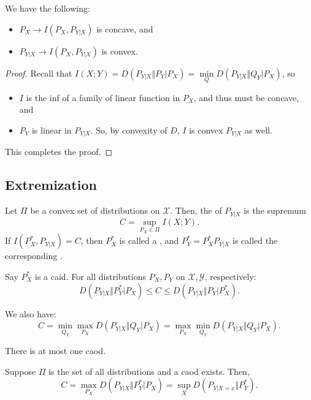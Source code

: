 \begin{thm}
	We have the following:
	\begin{itemize}
		\item $P_X \to I(P_X,P_{Y|X})$ is concave, and
		\item $P_{Y|X} \to I(P_X,P_{Y|X})$ is convex.
	\end{itemize}
\end{thm}

\begin{proof}
	Recall that $I(X;Y) = D(P_{Y|X} \Vert P_Y|P_X) = \min\limits_Q D(P_{Y|X} \Vert Q_Y|P_X)$, so 
	\begin{itemize}
		\item $I$ is the inf of a family of linear function in $P_X$, and thus must be concave, and
		\item $P_Y$ is linear in $P_{Y|X}$. So, by convexity of $D$, $I$ is convex $P_{Y|X}$ as well.  
	\end{itemize}
	This completes the proof.
\end{proof}

\subsection{Extremization}

\begin{defn}
	Let $\Pi$ be a convex set of distributions on $\mathcal X$. 
	Then, the  of $P_{Y|X}$ is the supremum \[
		C = \sup_{P_X\in \Pi} I(X;Y).
	\]
	If $I(P_X^*, P_{Y|X}) = C$, then $P_X^*$ is called a , and $P_Y^* = P_X^* P_{Y|X}$ is called the corresponding .
\end{defn}

\begin{thm}
	Say $P_X^*$ is a caid. For all distributions $P_X, P_Y$ on $\mathcal X, \mathcal Y$, respectively: \[
		D(P_{Y|X} \Vert P_Y^*|P_X) \leq C \leq D(P_{Y|X}\Vert P_Y|P_X^*).
	\]
\end{thm}

\begin{cor}
	We also have: \[
		C = \min_{Q_Y} \max_{P_X} D(P_{Y|X} \Vert Q_Y|P_X) = \max_{P_X} \min_{Q_Y} D(P_{Y|X} \Vert Q_Y|P_X).
	\]
\end{cor}

\begin{cor}
	There is at most one caod.
\end{cor}

\begin{cor}
	Suppose $\Pi$ is the set of all distributions and a caod exists. Then, \[
		C = \max_{P_X} D(P_{Y|X} \Vert P_Y^* |P_X) = \sup_X D(P_{Y|X=x} \Vert P_Y^*).
	\]	
\end{cor}
